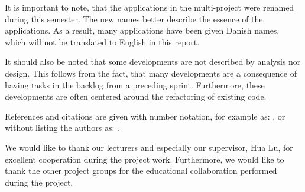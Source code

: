 It is important to note, that the applications in the multi-project were renamed during this semester.
The new names better describe the essence of the applications.
As a result, many applications have been given Danish names, which will not be translated to English in this report.

It should also be noted that some developments are not described by analysis nor design.
This follows from the fact, that many developments are a consequence of having tasks in the backlog from a preceding sprint.
Furthermore, these developments are often centered around the refactoring of existing code.

References and citations are given with number notation, for example as: \citet{launcher2011}, or without listing the authors as: \cite{launcher2011}.

We would like to thank our lecturers and especially our supervisor, Hua Lu, for excellent cooperation during the project work.
Furthermore, we would like to thank the other project groups for the educational collaboration performed during the project.
